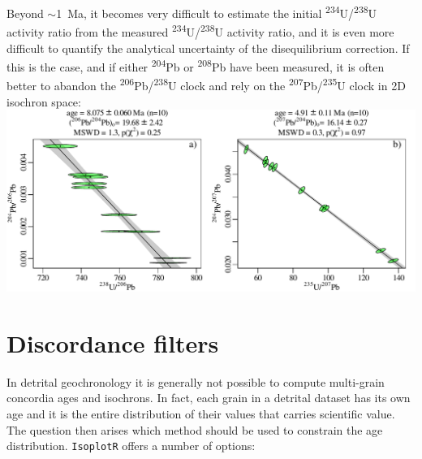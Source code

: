 \begin{refsection}
Beyond $\sim$1~Ma, it becomes very difficult to estimate the initial
\textsuperscript{234}U/\textsuperscript{238}U activity ratio from the
measured \textsuperscript{234}U/\textsuperscript{238}U activity ratio,
and it is even more difficult to quantify the analytical uncertainty
of the disequilibrium correction. If this is the case, and if either
\textsuperscript{204}Pb or \textsuperscript{208}Pb have been measured,
it is often better to abandon the
\textsuperscript{206}Pb/\textsuperscript{238}U clock and rely on the
\textsuperscript{207}Pb/\textsuperscript{235}U clock in 2D isochron
space:\\

\noindent\includegraphics[width=\linewidth]{../figures/2DUPbisochron.pdf}
\begingroup {}
\label{fig:2DUPbisochron}
\endgroup

\section{Discordance filters}
\label{sec:discfilter}

In detrital geochronology it is generally not possible to compute
multi-grain concordia ages and isochrons. In fact, each grain in a
detrital dataset has its own age and it is the entire distribution of
their values that carries scientific value. The question then arises
which method should be used to constrain the age distribution.
\texttt{IsoplotR} offers a number of options:


\end{refsection}
